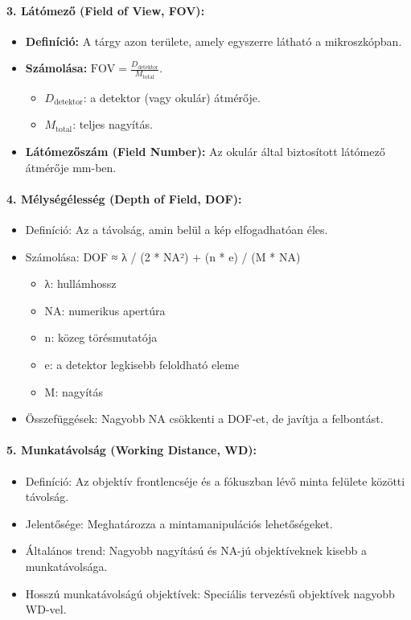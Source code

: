 \documentclass[a4paper,12pt]{article}
\begin{document}
\paragraph{3. Látómező (Field of View, FOV):} 
\begin{itemize}
    \item \textbf{Definíció:} A tárgy azon területe, amely egyszerre látható a mikroszkópban.
    \item \textbf{Számolása:} \( \text{FOV} = \frac{D_{\text{detektor}}}{M_{\text{total}}} \).
    \begin{itemize}
        \item \( D_{\text{detektor}} \): a detektor (vagy okulár) átmérője.
        \item \( M_{\text{total}} \): teljes nagyítás.
    \end{itemize}
    \item \textbf{Látómezőszám (Field Number):} Az okulár által biztosított látómező átmérője mm-ben.
\end{itemize}

\paragraph{4. Mélységélesség (Depth of Field, DOF):} \begin{itemize} \item Definíció: Az a távolság, amin belül a kép elfogadhatóan éles. \item Számolása: DOF ≈ λ / (2 * NA²) + (n * e) / (M * NA) \begin{itemize} \item λ: hullámhossz \item NA: numerikus apertúra \item n: közeg törésmutatója \item e: a detektor legkisebb feloldható eleme \item M: nagyítás \end{itemize} \item Összefüggések: Nagyobb NA csökkenti a DOF-et, de javítja a felbontást. \end{itemize}

\paragraph{5. Munkatávolság (Working Distance, WD):} \begin{itemize} \item Definíció: Az objektív frontlencséje és a fókuszban lévő minta felülete közötti távolság. \item Jelentősége: Meghatározza a mintamanipulációs lehetőségeket. \item Általános trend: Nagyobb nagyítású és NA-jú objektíveknek kisebb a munkatávolsága. \item Hosszú munkatávolságú objektívek: Speciális tervezésű objektívek nagyobb WD-vel. \end{itemize}
\end{document}
